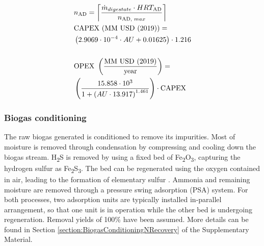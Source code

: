 \begin{refsection}[referencesCh6]
\begin{align} 
	& n_{\text{AD}} = \ceil*{\frac{\dot{m}_{digestate} \cdot HRT_{\text{AD}}}{n_{\text{AD, }max}}} \label{eq:nAD} \\
	& \text{CAPEX (MM USD (2019))} = \label{eq:inv_costs} \\
	& \left(2.9069 \cdot 10^{-4} \cdot AU+0.01625\right) \cdot 1.216 \nonumber \\ \nonumber\\
	& \text{OPEX } \left(\frac{\text{MM USD (2019)}}{\text{year}}\right) = \label{eq:OM_costs} \\
	& \left(\frac{15.858\cdot 10^{3}}{1+\left(AU \cdot 13.917\right)^{1.461}}\right) \cdot \text{CAPEX} \nonumber
\end{align}

\subsubsection{Biogas conditioning}
The raw biogas generated is conditioned to remove
its impurities. Most of moisture is removed through condensation by compressing and cooling down the biogas stream. H\textsubscript{2}S is removed by using a fixed bed of Fe\textsubscript{2}O\textsubscript{3}, capturing the hydrogen sulfur
as Fe\textsubscript{2}S\textsubscript{3}. The bed can be regenerated using the oxygen contained in air, leading to the formation of elementary sulfur \citep{ryckebosch2011techniques}. Ammonia and remaining moisture are removed through a pressure swing adsorption (PSA) system. For both processes, two adsorption units are typically installed in-parallel arrangement, so that one unit is in operation while the other bed is undergoing regeneration. Removal yields of 100\% have been assumed. More details can be found in
Section \ref{section:BiogasConditioningNRecovery} of the Supplementary Material.


\end{refsection}
